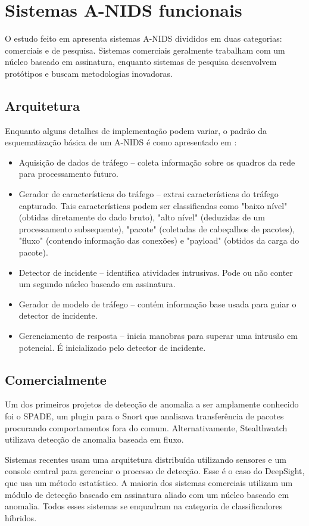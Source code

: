 \chapter{Sistemas A-NIDS funcionais}
    O estudo feito em \cite{teodoro09} apresenta sistemas A-NIDS divididos em duas categorias: comerciais e de pesquisa.
    Sistemas comerciais geralmente trabalham com um núcleo baseado em assinatura, enquanto sistemas de pesquisa
    desenvolvem protótipos e buscam metodologias inovadoras.

 \section{Arquitetura}
    Enquanto alguns detalhes de implementação podem variar, o padrão da esquematização básica de um A-NIDS
    é como apresentado em \cite{catania12}:
    \begin{itemize}
        \item Aquisição de dados de tráfego -- coleta informação sobre os quadros da rede para processamento futuro.
        \item Gerador de características do tráfego -- extrai características do tráfego capturado. Tais características
         podem ser classificadas como "baixo nível" (obtidas diretamente do dado bruto), "alto nível" (deduzidas de um
         processamento subsequente), "pacote" (coletadas de cabeçalhos de pacotes), "fluxo" (contendo informação das
         conexões) e "payload" (obtidos da carga do pacote).
        \item Detector de incidente -- identifica atividades intrusivas. Pode ou não conter um segundo núcleo baseado
        em assinatura.
        \item Gerador de modelo de tráfego -- contém informação base usada para guiar o detector de incidente.
        \item Gerenciamento de resposta -- inicia manobras para superar uma intrusão em potencial. É inicializado pelo
        detector de incidente.
    \end{itemize}

 \section{Comercialmente}
 Um dos primeiros projetos de detecção de anomalia a ser amplamente conhecido foi o SPADE, um plugin para o Snort que
 analisava transferência de pacotes procurando comportamentos fora do comum. Alternativamente, Stealthwatch utilizava
 detecção de anomalia baseada em fluxo.
 \par Sistemas recentes usam uma arquitetura distribuída utilizando sensores e um
 console central para gerenciar o processo de detecção. Esse é o caso do DeepSight, que usa um método estatístico.
 A maioria dos sistemas comerciais utilizam um módulo de detecção baseado em assinatura aliado com um núcleo baseado em
 anomalia. Todos esses sistemas se enquadram na categoria de classificadores híbridos.